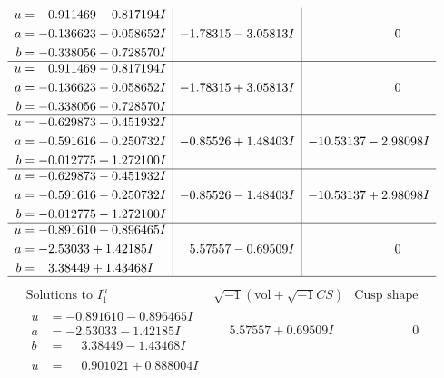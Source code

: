 \documentclass[1p]{elsarticle_modified}
\theoremstyle{definition}
\newcommand{\I}{\sqrt{-1}}
\begin{document}
$$\begin{array}{c|c|c}
\begin{aligned}
u &= \phantom{-}0.911469 + 0.817194 I \\
a &= -0.136623 - 0.058652 I \\
b &= -0.338056 - 0.728570 I\end{aligned}
 & -1.78315 - 3.05813 I & \phantom{-0.000000 } 0 \\ \hline\begin{aligned}
u &= \phantom{-}0.911469 - 0.817194 I \\
a &= -0.136623 + 0.058652 I \\
b &= -0.338056 + 0.728570 I\end{aligned}
 & -1.78315 + 3.05813 I & \phantom{-0.000000 } 0 \\ \hline\begin{aligned}
u &= -0.629873 + 0.451932 I \\
a &= -0.591616 + 0.250732 I \\
b &= -0.012775 + 1.272100 I\end{aligned}
 & -0.85526 + 1.48403 I & -10.53137 - 2.98098 I \\ \hline\begin{aligned}
u &= -0.629873 - 0.451932 I \\
a &= -0.591616 - 0.250732 I \\
b &= -0.012775 - 1.272100 I\end{aligned}
 & -0.85526 - 1.48403 I & -10.53137 + 2.98098 I \\ \hline\begin{aligned}
u &= -0.891610 + 0.896465 I \\
a &= -2.53033 + 1.42185 I \\
b &= \phantom{-}3.38449 + 1.43468 I\end{aligned}
 & \phantom{-}5.57557 - 0.69509 I & \phantom{-0.000000 } 0\\
 \hline 
 \end{array}$$\newpage$$\begin{array}{c|c|c}  
\text{Solutions to }I^u_{1}& \I (\text{vol} + \sqrt{-1}CS) & \text{Cusp shape}\\
 \hline 
\begin{aligned}
u &= -0.891610 - 0.896465 I \\
a &= -2.53033 - 1.42185 I \\
b &= \phantom{-}3.38449 - 1.43468 I\end{aligned}
 & \phantom{-}5.57557 + 0.69509 I & \phantom{-0.000000 } 0 \\ \hline\begin{aligned}
u &= \phantom{-}0.901021 + 0.888004 I \\

\end{aligned}
\end{array}$$
\end{document}

